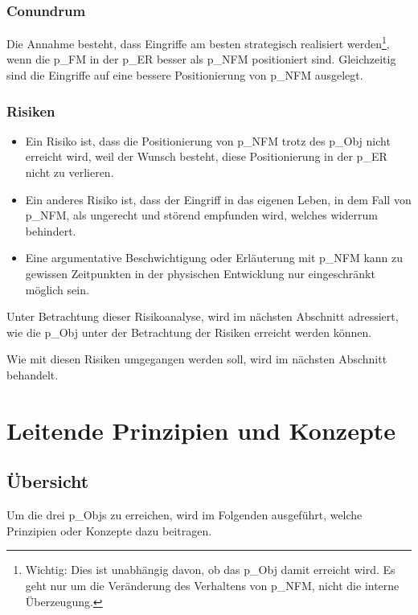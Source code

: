 \subsubsection{Conundrum} Die Annahme besteht, dass Eingriffe am besten strategisch realisiert werden\footnote{
	Wichtig: Dies ist unabhängig davon, ob das \gls{p_Obj} damit erreicht wird. Es geht nur um die Veränderung des Verhaltens von \gls{p_NFM}, nicht die interne Überzeugung.
}, wenn die \gls{p_FM} in der \gls{p_ER} besser als \gls{p_NFM} positioniert sind. Gleichzeitig sind die Eingriffe auf eine bessere Positionierung von \gls{p_NFM} ausgelegt.\\

\subsubsection{Risiken}
\begin{itemize}
	\item Ein Risiko ist, dass die Positionierung von \gls{p_NFM} trotz des \gls{p_Obj} nicht erreicht wird, weil der Wunsch besteht, diese Positionierung in der \gls{p_ER} nicht zu verlieren. 
	\item Ein anderes Risiko ist, dass der Eingriff in das eigenen Leben, in dem Fall von \gls{p_NFM}, als ungerecht und störend empfunden wird, welches widerrum \NFMOTwo behindert.
	\item Eine argumentative Beschwichtigung oder Erläuterung mit \gls{p_NFM} kann zu gewissen Zeitpunkten in der physischen Entwicklung nur eingeschränkt möglich sein.
\end{itemize}

Unter Betrachtung dieser Risikoanalyse, wird im nächsten Abschnitt adressiert, wie die \gls{p_Obj} unter der Betrachtung der Risiken erreicht werden können.

Wie mit diesen Risiken umgegangen werden soll, wird im nächsten Abschnitt behandelt.

\section{Leitende Prinzipien und Konzepte}\label{sec:Erreichung}
\subsection{Übersicht}
Um die drei \glspl{p_Obj} zu erreichen, wird im Folgenden ausgeführt, welche Prinzipien oder Konzepte dazu beitragen.

